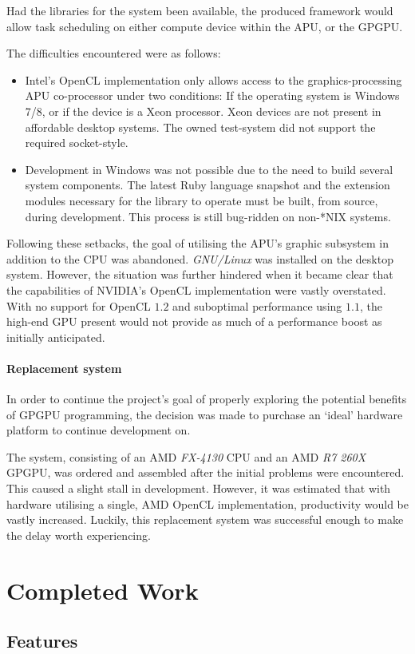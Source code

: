 Had the libraries for the system been available, the produced framework would allow task scheduling on either compute device within the \ac{APU}, or the \ac{GPGPU}.

The difficulties encountered were as follows:
\begin{itemize}
  \item Intel's \ac{OpenCL} implementation only allows access to the graphics-processing \ac{APU} co-processor under two conditions: If the operating system is Windows 7/8, or if the device is a Xeon processor. Xeon devices are not present in affordable desktop systems. The owned test-system did not support the required socket-style.

  \item Development in Windows was not possible due to the need to build several system components. The latest Ruby language snapshot and the extension modules necessary for the library to operate must be built, from source, during development. This process is still bug-ridden on non-*NIX systems.
\end{itemize}

Following these setbacks, the goal of utilising the \ac{APU}'s graphic subsystem in addition to the \ac{CPU} was abandoned. \emph{GNU/Linux} was installed on the desktop system. However, the situation was further hindered when it became clear that the capabilities of NVIDIA's \ac{OpenCL} implementation were vastly overstated. With no support for \ac{OpenCL} $1.2$ and suboptimal performance using $1.1$, the high-end \ac{GPU} present would not provide as much of a performance boost as initially anticipated.

\paragraph*{Replacement system}
In order to continue the project's goal of properly exploring the potential benefits of \ac{GPGPU} programming, the decision was made to purchase an `ideal' hardware platform to continue development on.

The system, consisting of an \ac{AMD} \emph{FX-4130} CPU and an \ac{AMD} \emph{R7 260X} \ac{GPGPU}, was ordered and assembled after the initial problems were encountered. This caused a slight stall in development. However, it was estimated that with hardware utilising a single, \ac{AMD} \ac{OpenCL} implementation, productivity would be vastly increased. Luckily, this replacement system was successful enough to make the delay worth experiencing.

\section{Completed Work}
\subsection{Features}
